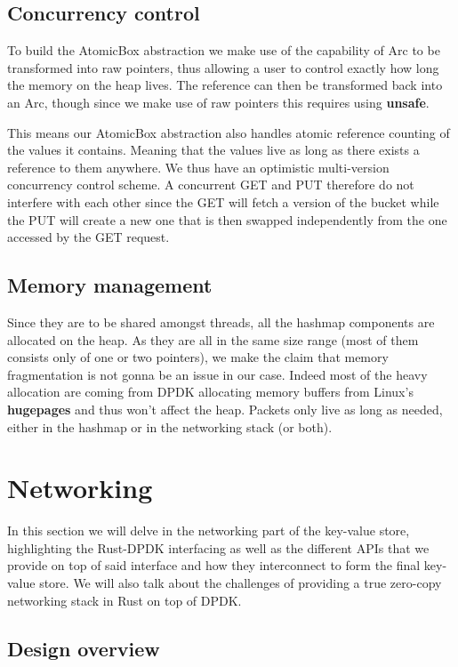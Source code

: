 \documentclass[11pt]{article}
\begin{document}
\subsection{Concurrency control}
To build the AtomicBox abstraction we make use of the capability of
Arc to be transformed into raw pointers, thus allowing a user to
control exactly how long the memory on the heap lives. The reference
can then be transformed back into an Arc, though since we make use of
raw pointers this requires using \textbf{unsafe}.

This means our AtomicBox abstraction also handles atomic reference
counting of the values it contains. Meaning that the values live as
long as there exists a reference to them anywhere. We thus have an
optimistic multi-version concurrency control scheme. A concurrent GET
and PUT therefore do not interfere with each other since the GET will
fetch a version of the bucket while the PUT will create a new one that
is then swapped independently from the one accessed by the GET
request.

\subsection{Memory management}
Since they are to be shared amongst threads, all the hashmap
components are allocated on the heap. As they are  all in the same
size range (most of them consists only of one or two pointers), we
make the claim that memory fragmentation is not gonna be an issue in
our case. Indeed most of the heavy allocation are coming from DPDK
allocating memory buffers from Linux's \textbf{hugepages} and thus
won't affect the heap. Packets only live as long as needed, either in
the hashmap or in the networking stack (or both).

\section{Networking}

In this section we will delve in the networking part of the key-value
store, highlighting the Rust-DPDK interfacing as well as the different
APIs that we provide on top of said interface and how they
interconnect to form the final key-value store. We will also talk
about the challenges of providing a true zero-copy networking stack in
Rust on top of DPDK.

\subsection{Design overview}
\end{document}
